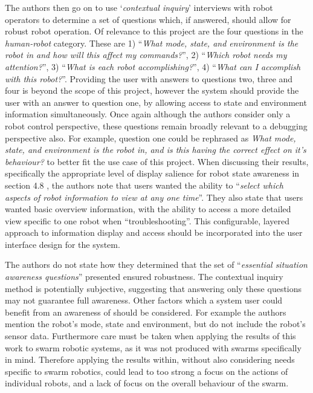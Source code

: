 The authors \cite{Rule:2012} then go on to use `\textit{contextual inquiry}' interviews with robot operators to determine a set of questions which, if answered, should allow for robust robot operation. Of relevance to this project are the four questions in the \textit{human-robot} category. These are 1) ``\textit{What mode, state, and environment is the robot in and how will this affect my commands?}'', 2) ``\textit{Which robot needs my attention?}'', 3) ``\textit{What is each robot accomplishing?}'', 4) ``\textit{What can I accomplish with this robot?}''. Providing the user with answers to questions two, three and four is beyond the scope of this project, however the system should provide the user with an answer to question one, by allowing access to state and environment information simultaneously. Once again although the authors \cite{Rule:2012} consider only a robot control perspective, these questions remain broadly relevant to a debugging perspective also. For example, question one could be rephrased as \textit{What mode, state, and environment is the robot in, and is this having the correct effect on it's behaviour?} to better fit the use case of this project. When discussing their results, specifically the appropriate level of display salience for robot state awareness in section 4.8 \cite{Rule:2012}, the authors note that users wanted the ability to ``\textit{select which aspects of robot information to view at any one time}''. They also state that users wanted basic overview information, with the ability to access a more detailed view specific to one robot when ``troubleshooting''. This configurable, layered approach to information display and access should be incorporated into the user interface design for the system.

The authors \cite{Rule:2012} do not state how they determined that the set of ``\textit{essential situation awareness questions}'' presented ensured robustness. The contextual inquiry method is potentially subjective, suggesting that answering only these questions may not guarantee full awareness. Other factors which a system user could benefit from an awareness of should be considered. For example the authors mention the robot's mode, state and environment, but do not include the robot's sensor data. Furthermore care must be taken when applying the results of this work to swarm robotic systems, as it was not produced with swarms specifically in mind. Therefore applying the results within, without also considering needs specific to swarm robotics, could lead to too strong a focus on the actions of individual robots, and a lack of focus on the overall behaviour of the swarm.

